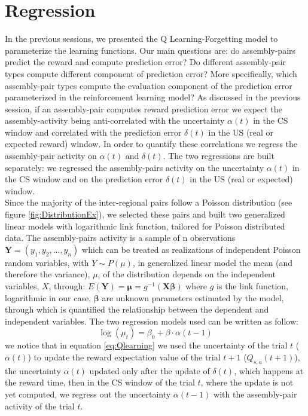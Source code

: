 \section{Regression}
\label{sec:Regression}
In the previous sessions, we presented the Q Learning-Forgetting model to parameterize the learning functions. Our main questions are: do assembly-pairs predict the reward and compute prediction error? Do different assembly-pair types compute different component of prediction error? More specifically, which assembly-pair types compute the evaluation component of the prediction error parameterized in the reinforcement learning model? As discussed in the previous session, if an assembly-pair computes reward prediction error we expect the assembly-activity being anti-correlated with the uncertainty $\alpha(t)$ in the CS window and correlated with the prediction error $\delta(t)$ in the US (real or expected reward) window. In order to quantify these correlations we regress the assembly-pair activity on $\alpha (t)$ and $\delta (t)$. The two regressions are built separately: we regressed the assembly-pairs activity on the uncertainty $\alpha(t)$ in the CS window and on the prediction error $\delta(t)$ in the US (real or expected) window.\\Since the majority of the inter-regional pairs follow a Poisson distribution (see figure \ref{fig:DistributionEx}), we selected these pairs and built two generalized linear models with logarithmic link function, tailored for Poisson distributed data.
The assembly-pairs activity is a sample of n observations $\mathbf{Y}=(y_1, y_2,..., y_n)$ which can be treated as realizations of independent Poisson random variables, with $Y\sim P(\mu)$, in generalized linear model the mean (and therefore the variance), $\mu$, of the distribution depends on the independent variables, $X$, through:
$E (\mathbf {Y} )={\boldsymbol {\mu }}=g^{-1}(\mathbf {X} {\boldsymbol {\beta }})$ where $g$ is the link function, logarithmic in our case, $\boldsymbol{\beta}$ are unknown parameters estimated by the model, through which is quantified the relationship between the dependent and independent variables. The two regression models used can be written as follow:
\begin{equation}
    \log(\mu_t)=\beta_0+\beta\cdot\alpha(t-1)
    \label{eq:regrAlpha}
\end{equation}
we notice that in equation \ref{eq:Qlearning} we used the uncertainty of the trial $t$ ($\alpha(t)$) to update the reward expectation value of the trial $t+1$ ($Q_{s,a}(t+1)$), the uncertainty $\alpha(t)$ updated only after the update of $\delta(t)$, which happens at the reward time, then in the CS window of the trial $t$, where the update is not yet computed, we regress out the uncertainty $\alpha(t-1)$ with the assembly-pair activity of the trial $t$.
